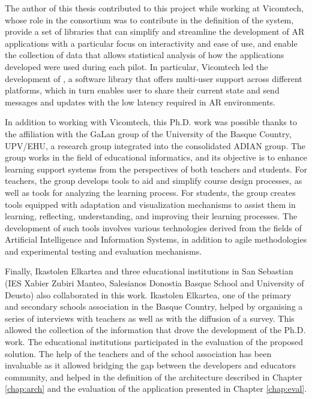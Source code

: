 The author of this thesis contributed to this project while working at Vicomtech, whose role in the consortium was to contribute in the definition of the system, provide a set of libraries that can simplify and streamline the development of AR applications with a particular focus on interactivity and ease of use, and enable the collection of data that allows statistical analysis of how the applications developed were used during each pilot. In particular, Vicomtech led the development of \ork{}, a software library that offers multi-user support across different platforms, which in turn enables user to share their current state and send messages and updates with the low latency required in AR environments.

In addition to working with Vicomtech, this Ph.D. work was possible thanks to the affiliation with the GaLan group of the University of the Basque Country, UPV/EHU, a research group integrated into the consolidated ADIAN group. The group works in the field of educational informatics, and its objective is to enhance learning support systems from the perspectives of both teachers and students. For teachers, the group develops tools to aid and simplify course design processes, as well as tools for analyzing the learning process. For students, the group creates tools equipped with adaptation and visualization mechanisms to assist them in learning, reflecting, understanding, and improving their learning processes. The development of such tools involves various technologies derived from the fields of Artificial Intelligence and Information Systems, in addition to agile methodologies and experimental testing and evaluation mechanisms.

Finally, Ikastolen Elkartea and three educational institutions in San Sebastian (IES Xabier Zubiri Manteo, Salesianos Donostia Basque School and University of Deusto) also collaborated in this work. Ikastolen Elkartea, one of the primary and secondary schools association in the Basque Country, helped by organising a series of interviews with teachers as well as with the diffusion of a survey. This allowed the collection of the information that drove the development of the Ph.D. work. The educational institutions participated in the evaluation of the proposed solution. The help of the teachers and of the school association has been invaluable as it allowed bridging the gap between the developers and educators community, and helped in the definition of the architecture described in Chapter \ref{chap:arch} and the evaluation of the application presented in Chapter \ref{chap:eval}.


